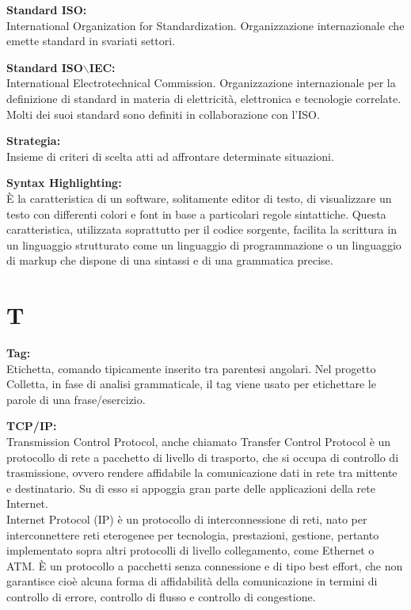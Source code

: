 \documentclass[a4paper, oneside, openany, dvipsnames, table]{article}
\begin{document}
\textbf{Standard ISO:}\\	International Organization for Standardization. Organizzazione internazionale che emette standard in svariati settori.

\textbf{Standard ISO$\backslash$IEC:}\\	International Electrotechnical Commission. Organizzazione internazionale per la definizione di standard in materia di elettricità, elettronica e tecnologie correlate. Molti dei suoi standard sono definiti in collaborazione con l'ISO.

\textbf{Strategia:}\\Insieme di criteri di scelta atti ad affrontare determinate situazioni.

\textbf{Syntax Highlighting:}\\	\`E la caratteristica di un software, 
solitamente editor di testo, di visualizzare un testo con differenti colori e font in base a particolari 
regole sintattiche. Questa caratteristica, utilizzata soprattutto per il codice sorgente, facilita la scrittura 
in un linguaggio strutturato come un linguaggio di programmazione o un linguaggio di markup che dispone di una 
sintassi e di una grammatica precise.
 
\newpage
\section{T}
\textbf{Tag:}\\	Etichetta, comando tipicamente inserito tra parentesi angolari. Nel progetto Colletta, in fase di analisi grammaticale, il tag viene usato per etichettare le parole di una frase/esercizio. 

\textbf{TCP/IP:}\\	Transmission Control Protocol, anche chiamato Transfer Control Protocol è un protocollo di rete a pacchetto di livello di trasporto, che si occupa di controllo di trasmissione, ovvero rendere affidabile la comunicazione dati in rete tra mittente e destinatario. Su di esso si appoggia gran parte delle applicazioni della rete Internet.
\\	Internet Protocol (IP) è un protocollo di interconnessione di reti, nato per interconnettere reti eterogenee per tecnologia, prestazioni, gestione, pertanto implementato sopra altri protocolli di livello collegamento, come Ethernet o ATM. \`E un protocollo a pacchetti  senza connessione e di tipo best effort, che non garantisce cioè alcuna forma di affidabilità della comunicazione in termini di controllo di errore, controllo di flusso e controllo di congestione.
\end{document}
